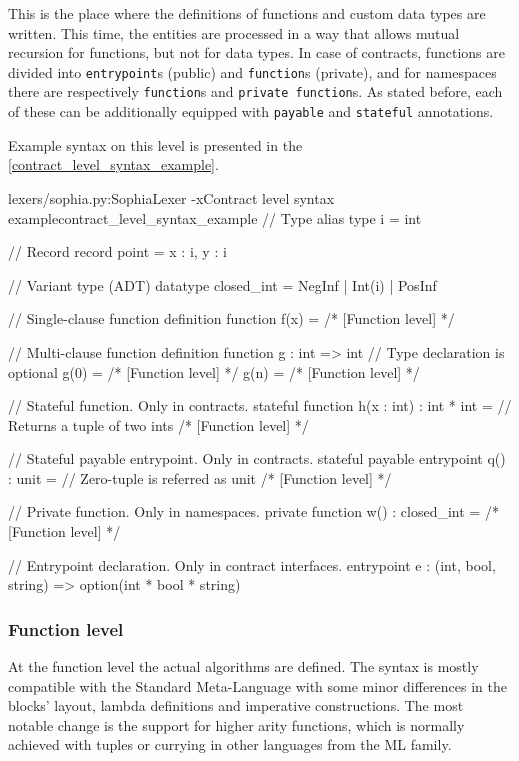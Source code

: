 This is the place where the definitions of functions and custom data types are
written. This time, the entities are processed in a way that allows mutual
recursion for functions, but not for data types. In case of contracts, functions
are divided into \texttt{entrypoint}s (public) and \texttt{function}s (private),
and for namespaces there are respectively \texttt{function}s and \texttt{private
  function}s. As stated before, each of these can be additionally equipped with
\texttt{payable} and \texttt{stateful} annotations.

Example syntax on this level is presented in the
\autoref{contract_level_syntax_example}.

\begin{code}[H]{lexers/sophia.py:SophiaLexer -x}{Contract level syntax
    example}{contract_level_syntax_example}
// Type alias
type i = int

// Record
record point = {x : i, y : i}

// Variant type (ADT)
datatype closed_int = NegInf | Int(i) | PosInf

// Single-clause function definition
function f(x) =
  /* [Function level] */

// Multi-clause function definition
function g : int => int  // Type declaration is optional
         g(0) = /* [Function level] */
         g(n) = /* [Function level] */

// Stateful function. Only in contracts.
stateful function h(x : int) : int * int = // Returns a tuple of two ints
  /* [Function level] */

// Stateful payable entrypoint. Only in contracts.
stateful payable entrypoint q() : unit = // Zero-tuple is referred as unit
  /* [Function level] */

// Private function. Only in namespaces.
private function w() : closed_int =
  /* [Function level] */

// Entrypoint declaration. Only in contract interfaces.
entrypoint e : (int, bool, string) => option(int * bool * string)
\end{code}

\subsubsection{Function level}

At the function level the actual algorithms are defined. The syntax is mostly
compatible with the Standard Meta-Language with some minor differences in the
blocks' layout, lambda definitions and imperative constructions. The most
notable change is the support for higher arity functions, which is normally
achieved with tuples or currying in other languages from the ML family.

